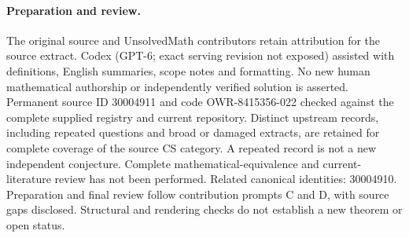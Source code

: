 \documentclass[11pt]{article}
\begin{document}
\paragraph{Preparation and review.}
The original source and UnsolvedMath contributors retain attribution for the source extract. Codex (GPT-6; exact serving revision not exposed) assisted with definitions, English summaries, scope notes and formatting. No new human mathematical authorship or independently verified solution is asserted. Permanent source ID 30004911 and code OWR-8415356-022 checked against the complete supplied registry and current repository. Distinct upstream records, including repeated questions and broad or damaged extracts, are retained for complete coverage of the source CS category. A repeated record is not a new independent conjecture. Complete mathematical-equivalence and current-literature review has not been performed. Related canonical identities: 30004910. Preparation and final review follow contribution prompts C and D, with source gaps disclosed. Structural and rendering checks do not establish a new theorem or open status.
\label{end:30004911}
\end{document}
